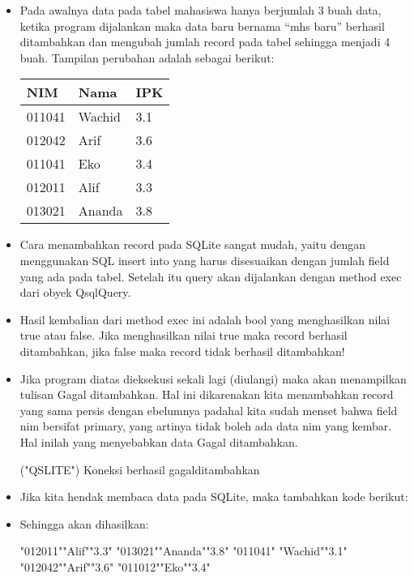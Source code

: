 \begin{itemize}
\item
Pada awalnya data pada tabel mahasiswa hanya berjumlah 3 buah data,
ketika program dijalankan maka data baru bernama ``mhs baru'' berhasil
ditambahkan dan mengubah jumlah record pada tabel sehingga menjadi 4
buah. Tampilan perubahan adalah sebagai berikut:

\begin{tabular}{|l|l|l|}
\hline
NIM & Nama & IPK \\ \hline
011041 & Wachid & 3.1 \\ \hline
012042 & Arif & 3.6 \\ \hline
011041 & Eko & 3.4 \\ \hline
012011 & Alif & 3.3 \\ \hline
013021 & Ananda & 3.8 \\ \hline

\end{tabular}
\item
Cara menambahkan record pada SQLite sangat mudah, yaitu dengan
menggunakan SQL insert into yang harus disesuaikan dengan jumlah field
yang ada pada tabel. Setelah itu query akan dijalankan dengan method
exec dari obyek QsqlQuery.
\item
Hasil kembalian dari method exec ini adalah bool yang menghasilkan
nilai true atau false. Jika menghasilkan nilai true maka record
berhasil ditambahkan, jika false maka record tidak berhasil
ditambahkan!
\item
Jika program diatas dieksekusi sekali lagi (diulangi) maka akan
menampilkan tulisan Gagal ditambahkan. Hal ini dikarenakan kita
menambahkan record yang sama persis dengan ebelumnya padahal kita
sudah menset bahwa field nim bersifat primary, yang artinya tidak
boleh ada data nim yang kembar. Hal inilah yang menyebabkan data Gagal
ditambahkan.
\begin{lcverbatim}
("QSLITE")
Koneksi berhasil
gagalditambahkan
\end{lcverbatim}

\item Jika kita hendak membaca data pada SQLite, maka tambahkan kode berikut:



\item Sehingga akan dihasilkan:

\begin{lcverbatim}
"012011""Alif""3.3"
"013021""Ananda""3.8" 
"011041" "Wachid""3.1" 
"012042""Arif""3.6" 
"011012""Eko""3.4" 

\end{lcverbatim}
\end{itemize}



